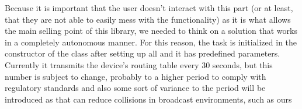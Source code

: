 Because it is important that the user doesn't interact with this part (or at least, that they are not able to easily mess with the functionality) as it is what allows the main selling point of this library, we needed to think on a solution that works in a completely autonomous manner. For this reason, the task is initialized in the constructor of the class after setting up all and it has predefined parameters. Currently it transmits the device's routing table every 30 seconds, but this number is subject to change, probably to a higher period to comply with regulatory standards and also some sort of variance to the period will be introduced as that can reduce collisions\cite{Floyd1994} in broadcast environments, such as ours
